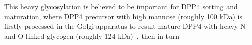 This heavy glycosylation is believed to be important for DPP4 sorting and maturation, where DPP4 precursor with high mannose (roughly 100 kDa) is firstly processed in the Golgi apparatus to result mature DPP4 with heavy N- and O-linked glycogen (roughly 124 kDa)~\cite{Matter_1991}, then in turn